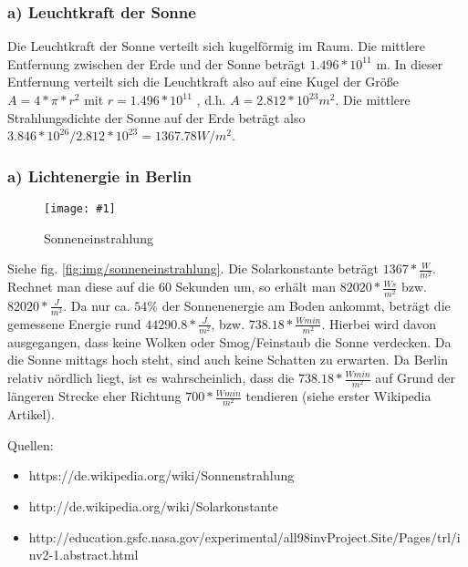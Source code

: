 \documentclass[a4paper,headings=small]{scrartcl}
\numberwithin{equation}{section} %
\numberwithin{figure}{section}   %
\newcommand{\image}[3]{
	\begin{figure}[htbp]
		\centering
		\texttt{[image: \#1]}
		\caption{#3}
		\label{fig:#1}
	\end{figure}
}
\begin{document}
\subsubsection*{a) Leuchtkraft der Sonne}

Die Leuchtkraft der Sonne verteilt sich kugelförmig im Raum.
Die mittlere Entfernung zwischen der Erde und der Sonne beträgt $1.496 * 10^{11}$ m.
In dieser Entfernung verteilt sich die Leuchtkraft also auf eine Kugel der Größe $A = 4 * \pi * r^{2}$ mit $r = 1.496 * 10^{11}$ , d.h. $A = 2.812 * 10^{23} m^{2}$.
Die mittlere Strahlungsdichte der Sonne auf der Erde beträgt also $3.846 * 10^{26} / 2.812 * 10^{23} = 1367.78 W / m^{2}$.

\subsubsection*{a) Lichtenergie in Berlin}

\image{img/sonneneinstrahlung2}{0.8}{Sonneneinstrahlung}

Siehe fig. \ref{fig:img/sonneneinstrahlung}.
Die Solarkonstante beträgt $1367 * \frac{W}{m^2}$. Rechnet man diese auf die 60 Sekunden um, so erhält man $82020 * \frac{W s}{m^2}$ bzw. $82020 * \frac{J}{m^2}$.
Da nur ca. $54\%$ der Sonnenenergie am Boden ankommt, beträgt die gemessene Energie rund $44290.8 * \frac{J}{m^2}$, bzw. $738.18 * \frac{W min}{m^2}$.
Hierbei wird davon ausgegangen, dass keine Wolken oder Smog/Feinstaub die Sonne verdecken. Da die Sonne mittags hoch steht, sind auch keine Schatten zu erwarten. 
Da Berlin relativ nördlich liegt, ist es wahrscheinlich, dass die $738.18 * \frac{W min}{m^2}$ auf Grund der längeren Strecke eher Richtung $700 * \frac{W min}{m^2}$ tendieren (siehe erster Wikipedia Artikel).

Quellen:
\begin{itemize}
\item https://de.wikipedia.org/wiki/Sonnenstrahlung
\item http://de.wikipedia.org/wiki/Solarkonstante
\item http://education.gsfc.nasa.gov/experimental/all98invProject.Site/Pages/trl/inv2-1.abstract.html
\end{itemize}
\end{document}
